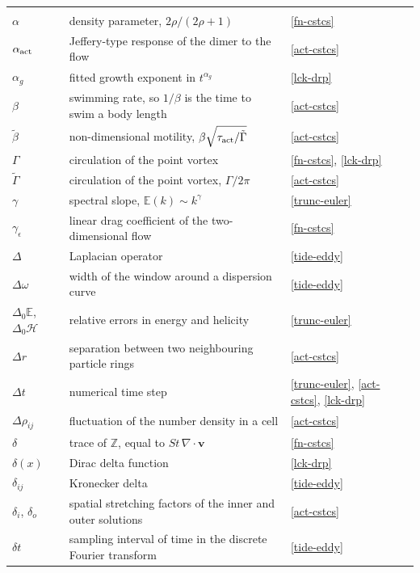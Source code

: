 \begin{longtable}{@{}p{}p{}p{}@{}}
\addlinespace
\midrule
\multicolumn{3}{@{}l}{\textbf{Greek letters}} \\
\addlinespace
$\alpha$ & density parameter, $2\rho/(2\rho+1)$ & \ref{fn-cstcs} \\
$\alpha_{\rm act}$ & Jeffery-type response of the dimer to the flow & \ref{act-cstcs} \\
$\alpha_g$ & fitted growth exponent in $t^{\alpha_g}$ & \ref{lck-drp} \\
\addlinespace
$\beta$ & swimming rate, so $1/\beta$ is the time to swim a body length & \ref{act-cstcs} \\
$\tilde{\beta}$ & non-dimensional motility, $\beta\sqrt{\tau_{\rm act}/\tilde{\Gamma}}$ & \ref{act-cstcs} \\
\addlinespace
$\Gamma$ & circulation of the point vortex & \ref{fn-cstcs}, \ref{lck-drp} \\
$\tilde{\Gamma}$ & circulation of the point vortex, $\Gamma/2\pi$ & \ref{act-cstcs} \\
$\gamma$ & spectral slope, $\mathbb{E}(k)\sim k^\gamma$ & \ref{trunc-euler} \\
$\gamma_\epsilon$ & linear drag coefficient of the two-dimensional flow & \ref{fn-cstcs} \\
\addlinespace
$\Delta$ & Laplacian operator & \ref{tide-eddy} \\
$\Delta\omega$ & width of the window around a dispersion curve & \ref{tide-eddy} \\
$\Delta_0\mathbb{E}$, $\Delta_0\mathcal{H}$ & relative errors in energy and helicity & \ref{trunc-euler} \\
$\Delta r$ & separation between two neighbouring particle rings & \ref{act-cstcs} \\
$\Delta t$ & numerical time step & \ref{trunc-euler}, \ref{act-cstcs}, \ref{lck-drp} \\
$\Delta\rho_{ij}$ & fluctuation of the number density in a cell & \ref{act-cstcs} \\
$\delta$ & trace of $\mathbb{Z}$, equal to $St\,\nabla\cdot\boldsymbol{v}$ & \ref{fn-cstcs} \\
$\delta(x)$ & Dirac delta function & \ref{lck-drp} \\
$\delta_{ij}$ & Kronecker delta & \ref{tide-eddy} \\
$\delta_i$, $\delta_o$ & spatial stretching factors of the inner and outer solutions & \ref{act-cstcs} \\
$\delta t$ & sampling interval of time in the discrete Fourier transform & \ref{tide-eddy} \\

\end{longtable}
